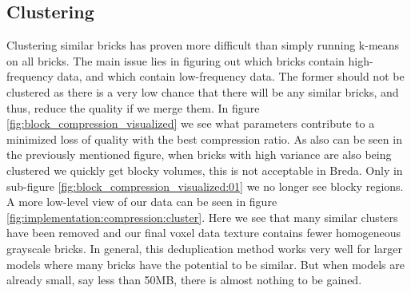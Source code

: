 \subsection{Clustering} \label{results:clustering}
Clustering similar bricks has proven more difficult than simply running k-means on all bricks. The main issue lies in figuring out which bricks contain high-frequency data, and which contain low-frequency data. The former should not be clustered as there is a very low chance that there will be any similar bricks, and thus, reduce the quality if we merge them. In figure \ref{fig:block_compression_visualized} we see what parameters contribute to a minimized loss of quality with the best compression ratio. As also can be seen in the previously mentioned figure, when bricks with high variance are also being clustered we quickly get blocky volumes, this is not acceptable in Breda. Only in sub-figure \ref{fig:block_compression_visualized:01} we no longer see blocky regions. A more low-level view of our data can be seen in figure \ref{fig:implementation:compression:cluster}. Here we see that many similar clusters have been removed and our final voxel data texture contains fewer homogeneous grayscale bricks.  In general, this deduplication method works very well for larger models where many bricks have the potential to be similar. But when models are already small, say less than 50MB, there is almost nothing to be gained. 


